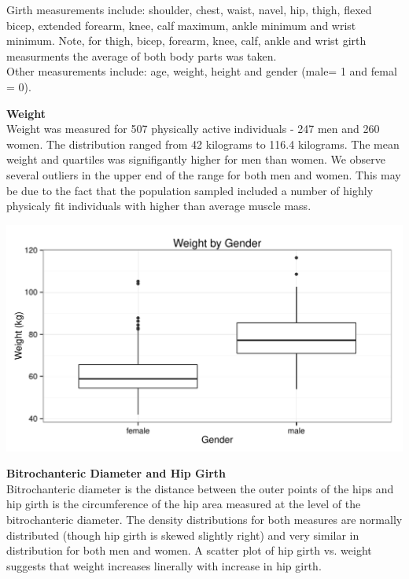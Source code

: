 \documentclass[11pt]{article}\usepackage[]{graphicx}\usepackage[]{color}
\makeatletter
\def\maxwidth{ %
  \ifdim\Gin@nat@width>\linewidth
    \linewidth
  \else
    \Gin@nat@width
  \fi
}
\newenvironment{knitrout}{}{} %
\makeatother
\begin{document}
Girth measurements include: shoulder, chest, waist, navel, hip, thigh, flexed bicep, extended forearm, knee, calf maximum, ankle minimum and wrist minimum. Note, for thigh, bicep, forearm, knee, calf, ankle and wrist girth measurments the average of both body parts was taken.\\

Other measurements include: age, weight, height and gender (male= 1 and femal = 0).\\


\newpage

\textbf{Weight}\\ %
   
Weight was measured for 507 physically active individuals - 247 men and 260 women. The distribution ranged from 42 kilograms to 116.4 kilograms. The mean weight and quartiles was signifigantly higher for men than women. We observe several outliers in the upper end of the range for both men and women. This may be due to the fact that the population sampled included a number of highly physicaly fit individuals with higher than average muscle mass.

\begin{knitrout}
\color{fgcolor}
\includegraphics[width=\maxwidth]{figure/weight_plot} 

\end{knitrout}



\newpage

\textbf{Bitrochanteric Diameter and Hip Girth}\\ %
 
Bitrochanteric diameter is the distance between the outer points of the hips and hip girth is the circumference of the hip area measured at the level of the bitrochanteric diameter. The density distributions for both measures are normally distributed (though hip girth is skewed slightly right) and very similar in distribution for both men and women. A scatter plot of hip girth vs. weight suggests that weight increases linerally with increase in hip girth.
\end{document}

